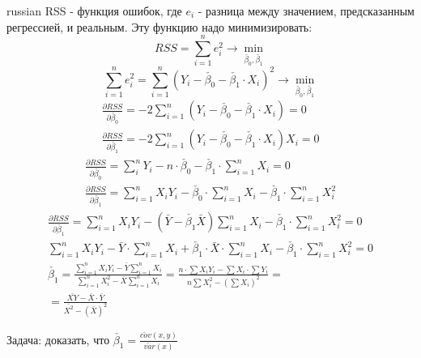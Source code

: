 \documentclass{article}
\begin{document}
\begin{otherlanguage*}{russian}
RSS - функция ошибок, где $e_i$ - разница между значением, предсказанным регрессией, и реальным.  Эту функцию надо минимизировать: 
\begin{equation}
RSS = \sum_{i=1}^n e_i^2 \rightarrow \min_{\check{\beta_0}, \check{\beta_1}}
\end{equation}
\begin{equation}
\sum_{i=1}^n e_i^2 = \sum_{i=1}^n (Y_i - \check{\beta_0} - \check{\beta_1} \cdot X_i)^2 \rightarrow \min_{\check{\beta_0}, \check{\beta_1}}  
\end{equation}
\begin{align}
\frac{\partial RSS}{\partial \check{\beta_0}} =- 2 \sum_{i=1}^n (Y_i - \check{\beta_0} - \check{\beta_1} \cdot X_i) = 0  \\
\frac{\partial RSS}{\partial \check{\beta_1}} = - 2 \sum_{i=1}^n (Y_i - \check{\beta_0} - \check{\beta_1} \cdot X_i) X_i = 0  
\end{align}
\begin{align}
\frac{\partial RSS}{\partial \check{\beta_0}} = \sum_{i}^n Y_i	 - n \cdot \check{\beta_0} - \check{\beta_1} \cdot \sum_{i=1}^n X_i = 0 \\
\frac{\partial RSS}{\partial \check{\beta_1}} = \sum_{i=1}^n X_i Y_i - \check{\beta_0} \cdot \sum_{i=1}^n X_i - \check{\beta_1} \cdot \sum_{i=1}^n X_i^ 2 
\end{align}
\begin{align}
\frac{\partial RSS}{\partial \check{\beta_1}} = \sum_{i=1}^n X_i Y_i - (\bar{Y} - \check{\beta_1} \bar{X}) \sum_{i=1}^n X_i - \check{\beta_1} \cdot \sum_{i=1}^n X_i^2 = 0 \\
\sum_{i=1}^n X_i Y_i - \bar{Y} \cdot \sum_{i=1}^n X_i + \check{\beta_1} \cdot \bar{X} \cdot \sum_{i=1}^n X_i - \check{\beta_1} \cdot \sum_{i=1}^n X_i^2 = 0 \\
\check{\beta_1} = \frac{\sum_{i=1}^n X_i Y_i - \bar{Y} \sum_{i=1}^n X_i}{\sum_{i=1}^n X_i^2 - \bar{X} \sum_{i=1}^n X_i} = \frac{n \cdot \sum X_i Y_i - \sum X_i \cdot \sum Y_i}{n \sum X_i^2 - (\sum X_i)^2} = \\
= \frac{\bar{XY} - \bar{X} \cdot \bar{Y}}{\bar{X^2} - (\bar{X})^2}
\end{align}

Задача: доказать, что $ \check{\beta_1} = \frac{\check{cov} (x, y)}{\check{var} (x)}$


\end{otherlanguage*}
\end{document}
